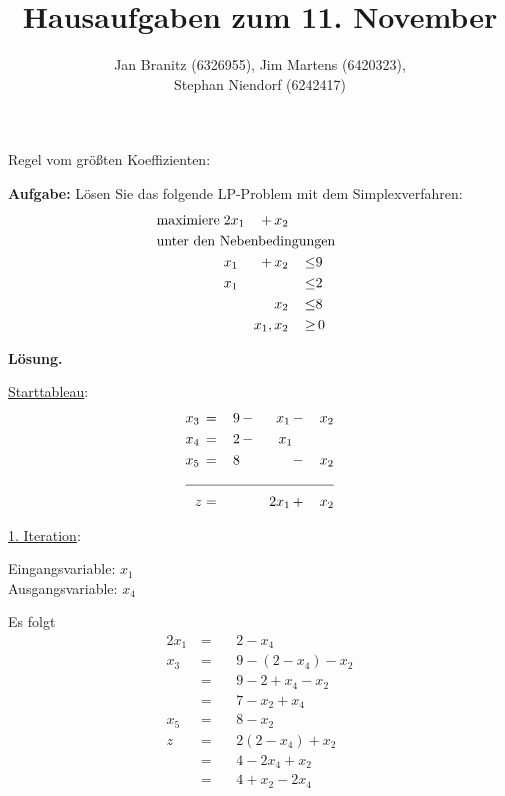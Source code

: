 \documentclass[10pt,a4paper,oneside,ngerman,numbers=noenddot]{scrartcl}
\begin{document}
\author{Jan Branitz (6326955), Jim Martens (6420323),\\
Stephan Niendorf (6242417)}
\title{Hausaufgaben zum 11. November}
\maketitle
\section{} %
	\subsection{} %
		\subsubsection{} %
			Regel vom größten Koeffizienten:
			
				\textbf{Aufgabe:} Lösen Sie das folgende LP-Problem mit dem Simplexverfahren:
		\begin{alignat*}{3}
			\text{maximiere}\; & 2x_{1} \,&+&\, x_{2} && \\
			\multicolumn{6}{l}{\text{unter den Nebenbedingungen}} && \\
			\;& x_{1} \,&+&\, x_{2} \,&\leq & 9 \\
			\;& x_{1} \,&& &\leq & 2 \\
			\;& &&\, x_{2} \,&\leq & 8 \\
			\multicolumn{4}{r}{$x_{1}, x_{2}$} \,&\geq &\, 0
		\end{alignat*}
		
		\textbf{Lösung.}
		
		\underline{Starttableau}:
		\begin{alignat*}{4}
			x_{3} \,&=&\, 9 \,&-&\, x_{1} \,&-&\, x_{2} \\
			x_{4} \,&=&\, 2 \,&-&\, x_{1} && \\
			x_{5} \,&=&\, 8 \,&& &-&\, x_{2} \\ \cline{1 - 7}
			z &=& &&\, 2x_{1} \,&+&\, x_{2}
		\end{alignat*}
		
		\underline{1. Iteration}:
		
		Eingangsvariable: $x_{1}$\\
		Ausgangsvariable: $x_{4}$
		
		Es folgt
		\begin{alignat*}{2}
			x_{1} \,&=&&\, 2 - x_{4} \\
			x_{3} \,&=&&\, 9 - \left(2 - x_{4}\right) - x_{2} \\
			&=&&\, 9 - 2 + x_{4} - x_{2} \\
			&=&&\, 7 - x_{2} + x_{4} \\
			x_{5} \,&=&&\, 8 - x_{2} \\
			z \,&=&&\, 2\left(2 - x_{4}\right) + x_{2} \\
			&=&&\, 4 - 2x_{4} + x_{2} \\
			&=&&\, 4 + x_{2} - 2x_{4}
		\end{alignat*}
		
\end{document}
